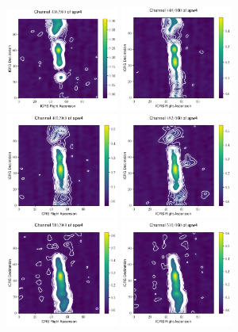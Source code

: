 \documentclass[10pt]{article}
\begin{document}
\begin{figure}
\includegraphics[width=0.33\textwidth]{spw4_438}
\includegraphics[width=0.33\textwidth]{spw4_448}
\includegraphics[width=0.33\textwidth]{spw4_465}
\includegraphics[width=0.33\textwidth]{spw4_482}
\includegraphics[width=0.33\textwidth]{spw4_510}
\includegraphics[width=0.33\textwidth]{spw4_516}
\end{figure}
\end{document}
